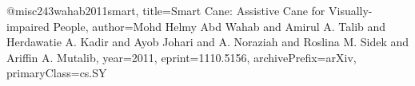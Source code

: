 @misc{243wahab2011smart,
title={Smart Cane: Assistive Cane for Visually-impaired People}, 
author={Mohd Helmy Abd Wahab and Amirul A. Talib and Herdawatie A. Kadir and Ayob Johari and A. Noraziah and Roslina M. Sidek and Ariffin A. Mutalib},
year={2011},
eprint={1110.5156},
archivePrefix={arXiv},
primaryClass={cs.SY}
}